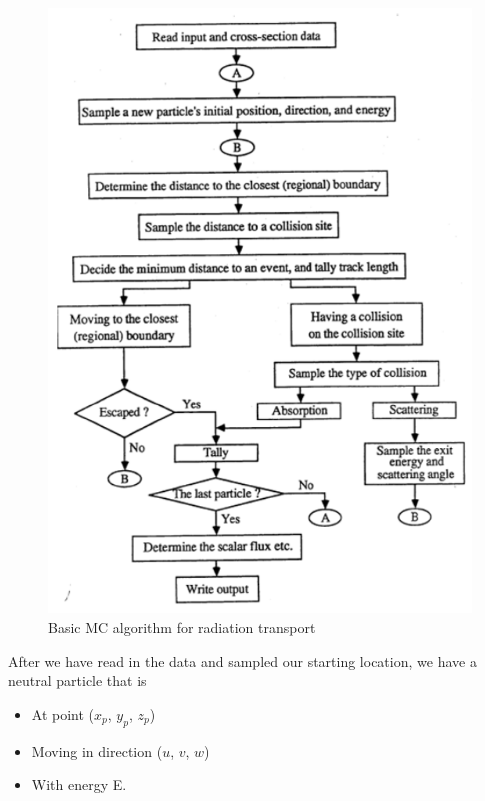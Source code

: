 \documentclass[12pt]{article}
\begin{document}
\begin{figure}[h!]
\begin{center}
\includegraphics[scale=0.80]{../figs/mcAlgo.png}
\caption{Basic MC algorithm for radiation transport}
\label{fig: mc_algo}
\end{center}
\end{figure}

After we have read in the data and sampled our starting location, we have a neutral particle that is

\begin{itemize}
  \item At point ($x_p$, $y_p$, $z_p$)
  \item Moving in direction ($u$, $v$, $w$)
  \item With energy E.
\end{itemize}
\end{document}
